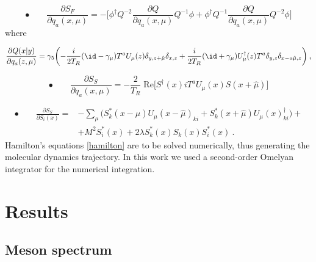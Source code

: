 \begin{equation}
\bullet \qquad\frac{\partial S_F}{\partial q_a(x,\mu)} =   -\biggl[ \phi^{\dagger} Q^{-2}\frac{\partial Q}{\partial q_a(x,\mu)} Q^{-1} \phi + \phi^{\dagger} Q^{-1} \frac{\partial Q}{\partial q_a(x,\mu)} Q^{-2} \phi \biggr] 
\end{equation}
%
where

\begin{equation}
\frac{\partial Q(x \vert y)}{\partial q_a(z,\mu)} = \gamma_5 \biggl( -\frac{i}{2T_R} (\id - \gamma_{\mu}) T^a U_{\mu}(z) \delta_{y,z+\hat\mu} \delta_{x,z} +\frac{i}{2T_R}(\id + \gamma_{\mu}) U_{\mu}^{\dagger}(z) T^a \delta_{y,z} \delta_{x-a\hat\mu,z} \biggr) \: ,
\end{equation}


\begin{equation}
\bullet \qquad
\frac{\partial S_S}{\partial q_a(x,\mu)} = - \frac{2}{T_R} \; \mathrm{Re} \biggl[ S^{\dagger}(x) i T^a U_{\mu}(x) S(x+\hat\mu) \biggr] 
\end{equation}



\begin{equation}
\begin{split}
\bullet \qquad
\frac{\partial S_S}{\partial S_i(x)} = & - \sum_{\mu} \biggl( S^*_k(x-\hat \mu) U_{\mu}(x-\hat\mu)_{ki} + S^*_k(x+\hat\mu) U_{\mu}(x)^{\dagger}_{ki} \biggr) +  \\
& + M^2 S_i^*(x) + 2 \lambda S_k^*(x) S_k(x) S_i^*(x) \: .
\end{split}
\end{equation}
%
Hamilton's equations \ref{hamilton} are to be solved numerically, thus generating the molecular dynamics trajectory. In this work we used a second-order Omelyan integrator \cite{PhysRevE.65.056706,OMELYAN2003272} for the numerical integration.




\section{Results}

\subsection{Meson spectrum}


